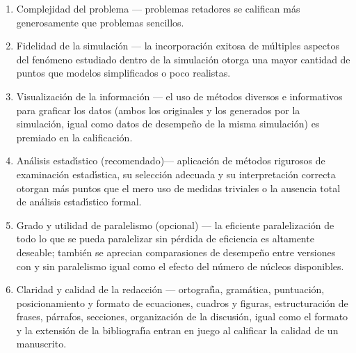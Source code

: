 \begin{enumerate}[itemsep=-1pt]
\item{Complejidad del problema --- problemas retadores se califican
    m\'{a}s generosamente que problemas sencillos.}
\item{Fidelidad de la
    simulaci\'{o}n --- la incorporaci\'{o}n exitosa de m\'{u}ltiples aspectos del
    fen\'{o}meno estudiado dentro de la simulaci\'{o}n otorga una mayor
    cantidad de puntos que modelos simplificados o poco realistas.}
\item{Visualizaci\'{o}n de la informaci\'{o}n --- el uso de m\'{e}todos diversos e
    informativos para graficar los datos (ambos los originales y los
    generados por la simulaci\'{o}n, igual como datos de desempe\~{n}o de la
    misma simulaci\'{o}n) es premiado en la calificaci\'{o}n.}
\item{An\'{a}lisis estad\'{\i}stico (recomendado)--- aplicaci\'{o}n de
    m\'{e}todos rigurosos de examinaci\'{o}n estad\'{\i}stica, su
    selecci\'{o}n adecuada y su interpretaci\'{o}n correcta otorgan
    m\'{a}s puntos que el mero uso de medidas triviales o la ausencia
    total de an\'{a}lisis estad\'{\i}stico formal.}
\item{Grado y utilidad de paralelismo (opcional) --- la eficiente
    paralelizaci\'{o}n de todo lo que se pueda paralelizar sin
    p\'{e}rdida de eficiencia es altamente deseable; tambi\'{e}n se
    aprecian comparasiones de desempe\~{n}o entre versiones con y sin
    paralelismo igual como el efecto del n\'{u}mero de n\'{u}cleos
    disponibles.}
\item{Claridad y calidad de la redacci\'{o}n --- ortograf\'{\i}a,
    gram\'{a}tica, puntuaci\'{o}n, posicionamiento y formato de
    ecuaciones, cuadros y figuras, estructuraci\'{o}n de frases,
    p\'{a}rrafos, secciones, organizaci\'{o}n de la discusi\'{o}n,
    igual como el formato y la extensi\'{o}n de la bibliograf\'{\i}a
    entran en juego al calificar la calidad de un manuscrito.}
\end{enumerate}
